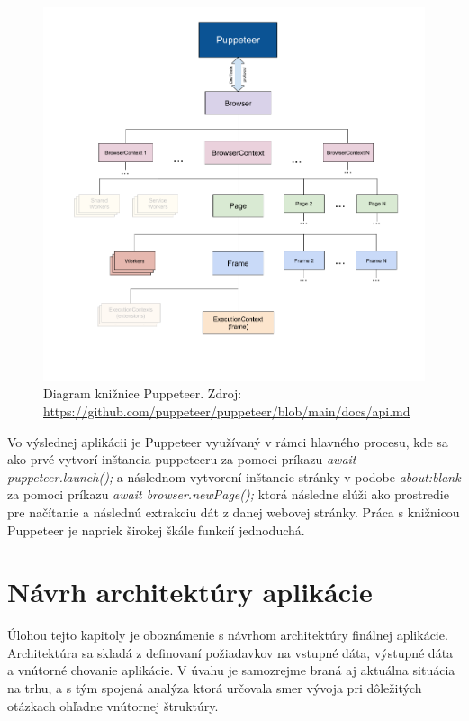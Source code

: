 \begin{figure}[hbt]
	\centering
	\includegraphics[width=1\textwidth]{obrazky-figures/diagram.png}
	\caption{Diagram knižnice Puppeteer. Zdroj: \url{https://github.com/puppeteer/puppeteer/blob/main/docs/api.md}}
	\label{diagram}
\end{figure}

Vo výslednej aplikácii je Puppeteer využívaný v rámci hlavného procesu, kde sa ako prvé vytvorí inštancia puppeteeru za pomoci príkazu \textit{await puppeteer.launch();} a následnom vytvorení inštancie stránky v podobe \textit{about:blank} za pomoci príkazu \textit{await browser.newPage();} ktorá následne slúži ako prostredie pre načítanie a následnú extrakciu dát z danej webovej stránky. Práca s knižnicou Puppeteer je napriek širokej škále funkcií jednoduchá.

\chapter{Návrh architektúry aplikácie}
\label{Navrh}
Úlohou tejto kapitoly je oboznámenie s návrhom architektúry finálnej aplikácie. Architektúra sa skladá z definovaní požiadavkov na vstupné dáta, výstupné dáta a vnútorné chovanie aplikácie. V úvahu je samozrejme braná aj aktuálna situácia na trhu, a s tým spojená analýza ktorá určovala smer vývoja pri dôležitých otázkach ohľadne vnútornej štruktúry.

